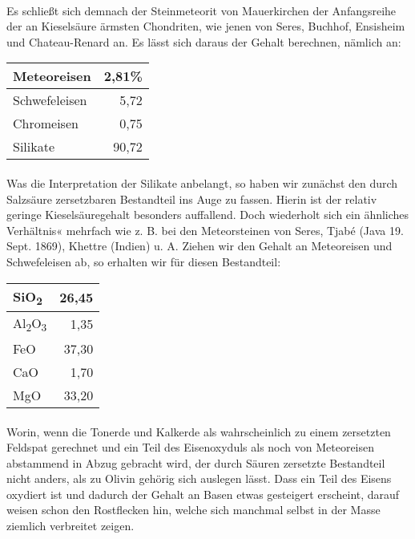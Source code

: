 \documentclass[a4paper, 11pt, oneside]{article}
\begin{document}
\paragraph{}
Es schließt sich demnach der Steinmeteorit von Mauerkirchen der Anfangsreihe der an Kieselsäure ärmsten Chondriten, wie jenen von Seres, Buchhof, Ensisheim und Chateau-Renard an. Es lässt sich daraus der Gehalt berechnen, nämlich an:
\begin{center}
    \begin{tabular}{ |l|r| } 
    \hline
    Meteoreisen & 2,81\%\\\hline
    Schwefeleisen & 5,72\\\hline
    Chromeisen & 0,75\\\hline
    Silikate & 90,72\\
    \hline
    \end{tabular}
\end{center}
\paragraph{}
Was die Interpretation der Silikate anbelangt, so haben wir zunächst den durch Salzsäure zersetzbaren Bestandteil ins Auge zu fassen. Hierin ist der relativ geringe Kieselsäuregehalt besonders auffallend. Doch wiederholt sich ein ähnliches Verhältnis« mehrfach wie z. B. bei den Meteorsteinen von Seres, Tjabé (Java 19. Sept. 1869), Khettre (Indien) u. A. Ziehen wir den Gehalt an Meteoreisen und Schwefeleisen ab, so erhalten wir für diesen Bestandteil:
\begin{center}
    \begin{tabular}{ |l|r| } 
    \hline
    SiO\textsubscript{2} & 26,45\\\hline
    Al\textsubscript{2}O\textsubscript{3} & 1,35\\\hline
    FeO & 37,30\\\hline
    CaO & 1,70\\\hline
    MgO & 33,20\\
    \hline
    \end{tabular}
\end{center}
\paragraph{}
Worin, wenn die Tonerde und Kalkerde als wahrscheinlich zu einem zersetzten Feldspat gerechnet und ein Teil des Eisenoxyduls als noch von Meteoreisen abstammend in Abzug gebracht wird, der durch Säuren zersetzte Bestandteil nicht anders, als zu Olivin gehörig sich auslegen lässt. Dass ein Teil des Eisens oxydiert ist und dadurch der Gehalt an Basen etwas gesteigert erscheint, darauf weisen schon den Rostflecken hin, welche sich manchmal selbst in der Masse ziemlich verbreitet zeigen.
\end{document}
